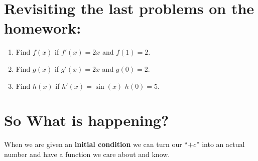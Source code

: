 \documentclass{article}[12pt]
\theoremstyle{definition}
\theoremstyle{example}
\theoremstyle{theorem}
\begin{document}
\section{Revisiting the last problems on the homework:}
\begin{enumerate}
        \item Find $f(x)$ if $f'(x)=2x$ and $f(1)=2$.
        \vspace{1cm}
        \item Find $g(x)$ if $g'(x)=2x$ and $g(0)=2$. 
        \vspace{1cm}
        \item Find $h(x)$ if $h'(x)=\sin(x)$ $h(0)=5$.
        \vspace{1cm}
\end{enumerate}
\section{So What is happening?}
When we are given an \textbf{initial condition} we can turn our ``$+c$'' into an actual number and have a function we care about and know. 
\end{document}
